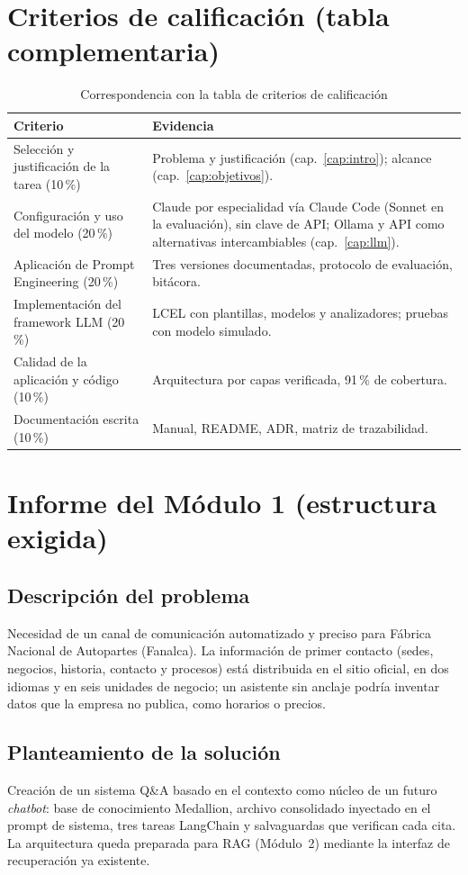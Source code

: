 \section{Criterios de calificación (tabla complementaria)}
\begin{table}[H]\centering\small
\caption{Correspondencia con la tabla de criterios de calificación}\label{tab:criterios}
\begin{tabularx}{\linewidth}{@{}l X@{}}\toprule
Criterio & Evidencia\\\midrule
Selección y justificación de la tarea (10\,\%) & Problema y justificación (cap.~\ref{cap:intro}); alcance (cap.~\ref{cap:objetivos}).\\
Configuración y uso del modelo (20\,\%) & Claude por especialidad vía Claude Code (Sonnet en la evaluación), sin clave de API; Ollama y API como alternativas intercambiables (cap.~\ref{cap:llm}).\\
Aplicación de Prompt Engineering (20\,\%) & Tres versiones documentadas, protocolo de evaluación, bitácora.\\
Implementación del framework LLM (20\,\%) & LCEL con plantillas, modelos y analizadores; pruebas con modelo simulado.\\
Calidad de la aplicación y código (10\,\%) & Arquitectura por capas verificada, 91\,\% de cobertura.\\
Documentación escrita (10\,\%) & Manual, README, ADR, matriz de trazabilidad.\\\bottomrule
\end{tabularx}
\end{table}

\section{Informe del Módulo 1 (estructura exigida)}\label{sec:informe}
\subsection*{Descripción del problema}
Necesidad de un canal de comunicación automatizado y preciso para Fábrica Nacional de Autopartes (Fanalca). La
información de primer contacto (sedes, negocios, historia, contacto y procesos) está distribuida en el sitio
oficial, en dos idiomas y en seis unidades de negocio; un asistente sin anclaje podría inventar datos que la
empresa no publica, como horarios o precios.

\subsection*{Planteamiento de la solución}
Creación de un sistema Q\&A basado en el contexto como núcleo de un futuro \emph{chatbot}: base de conocimiento
Medallion, archivo consolidado inyectado en el prompt de sistema, tres tareas LangChain y salvaguardas que
verifican cada cita. La arquitectura queda preparada para RAG (Módulo~2) mediante la interfaz de recuperación
ya existente.

